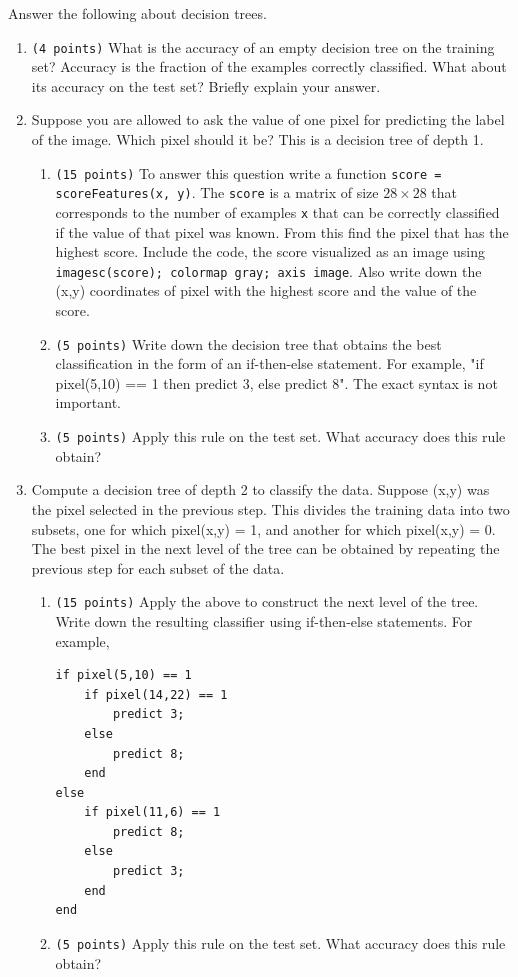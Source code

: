 \documentclass[10pt,letterpaper]{article}
\newcommand{\cmd}[1] {{\color{blue}\texttt{#1}}}
\begin{document}
Answer the following about decision trees.
\begin{enumerate}
\item \cmd{(4 points)} What is the accuracy of an empty decision tree on the training set? Accuracy is the fraction of the examples correctly classified. What about its accuracy on the test set? Briefly explain your answer.

\item Suppose you are allowed to ask the value of one pixel for predicting the label of the image. Which pixel should it be? This is a decision tree of depth 1.

\begin{enumerate}
\item \cmd{(15 points)} To answer this question write a function \cmd{score = scoreFeatures(x, y)}. 
The \cmd{score} is a matrix of size $28\times 28$ that corresponds to the number of examples \cmd{x} that can be correctly classified if the value of that pixel was known. 
From this find the pixel that has the highest score. 
Include the code, the score visualized as an image using \cmd{imagesc(score); colormap gray; axis image}. 
Also write down the (x,y) coordinates of pixel with the highest score and the value of the score.

\item \cmd{(5 points)} Write down the decision tree that obtains the best classification in the form of an if-then-else statement. For example, "if pixel(5,10) == 1 then predict 3, else predict 8". The exact syntax is not important.

\item \cmd{(5 points)} Apply this rule on the test set. What accuracy does this rule obtain?
\end{enumerate}

\item Compute a decision tree of depth 2 to classify the data. 
Suppose (x,y) was the pixel selected in the previous step. 
This divides the training data into two subsets, one for which pixel(x,y) = 1, and another for which pixel(x,y) = 0. 
The best pixel in the next level of the tree can be obtained by repeating the previous step for each subset of the data.
\begin{enumerate}
\item \cmd{(15 points)} Apply the above to construct the next level of the tree. Write down the resulting classifier using if-then-else statements. For example, 
\begin{verbatim}
if pixel(5,10) == 1
    if pixel(14,22) == 1
        predict 3;
    else
        predict 8;
    end
else 
    if pixel(11,6) == 1
        predict 8;
    else
        predict 3;
    end
end
\end{verbatim}
\item \cmd{(5 points)} Apply this rule on the test set. What accuracy does this rule obtain?
\end{enumerate}
\end{enumerate}
\end{document}
